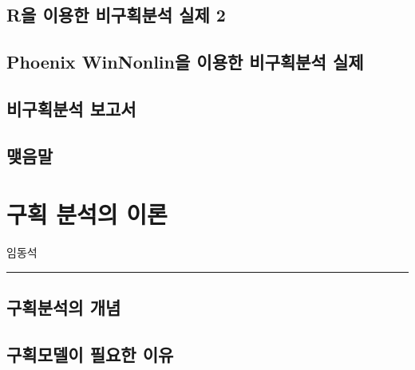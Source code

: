 \documentclass[
  11pt,
  krantz2, a4paper, twoside]{krantz}
\begin{document}
\hypertarget{ruxc744-uxc774uxc6a9uxd55c-uxbe44uxad6cuxd68duxbd84uxc11d-uxc2e4uxc81c-2}{%
\section{R을 이용한 비구획분석 실제 2}\label{ruxc744-uxc774uxc6a9uxd55c-uxbe44uxad6cuxd68duxbd84uxc11d-uxc2e4uxc81c-2}}

\hypertarget{phoenix-winnonlinuxc744-uxc774uxc6a9uxd55c-uxbe44uxad6cuxd68duxbd84uxc11d-uxc2e4uxc81c}{%
\section{Phoenix WinNonlin을 이용한 비구획분석 실제}\label{phoenix-winnonlinuxc744-uxc774uxc6a9uxd55c-uxbe44uxad6cuxd68duxbd84uxc11d-uxc2e4uxc81c}}

\hypertarget{uxbe44uxad6cuxd68duxbd84uxc11d-uxbcf4uxace0uxc11c}{%
\section{비구획분석 보고서}\label{uxbe44uxad6cuxd68duxbd84uxc11d-uxbcf4uxace0uxc11c}}

\hypertarget{uxb9fauxc74cuxb9d0-2}{%
\section{맺음말}\label{uxb9fauxc74cuxb9d0-2}}

\hypertarget{ca-principle}{%
\chapter{구획 분석의 이론}\label{ca-principle}}

\Large\hfill

임동석
\normalsize

\begin{center}\rule{0.5\linewidth}{0.5pt}\end{center}

\hypertarget{uxad6cuxd68duxbd84uxc11duxc758-uxac1cuxb150}{%
\section{구획분석의 개념}\label{uxad6cuxd68duxbd84uxc11duxc758-uxac1cuxb150}}

\hypertarget{uxad6cuxd68duxbaa8uxb378uxc774-uxd544uxc694uxd55c-uxc774uxc720}{%
\section{구획모델이 필요한 이유}\label{uxad6cuxd68duxbaa8uxb378uxc774-uxd544uxc694uxd55c-uxc774uxc720}}
\end{document}
